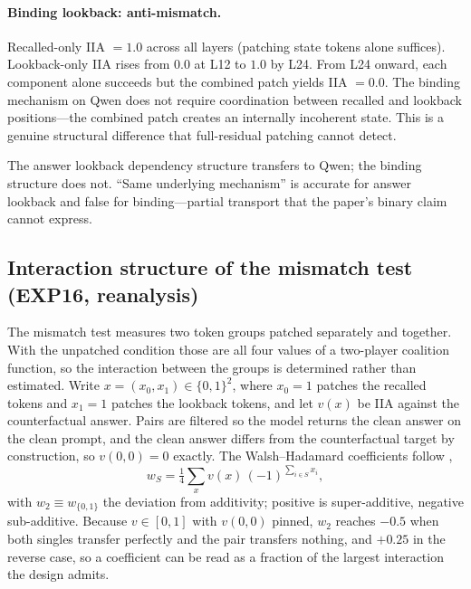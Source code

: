\documentclass{article}
\begin{document}
\paragraph{Binding lookback: anti-mismatch.}
Recalled-only IIA $= 1.0$ across all layers (patching state tokens alone suffices). Lookback-only IIA rises from $0.0$ at L12 to $1.0$ by L24. From L24 onward, each component alone succeeds but the combined patch yields IIA $= 0.0$. The binding mechanism on Qwen does not require coordination between recalled and lookback positions---the combined patch creates an internally incoherent state. This is a genuine structural difference that full-residual patching cannot detect.

The answer lookback dependency structure transfers to Qwen; the binding structure does not. ``Same underlying mechanism'' is accurate for answer lookback and false for binding---partial transport that the paper's binary claim cannot express.

\subsection{Interaction structure of the mismatch test (EXP16, reanalysis)}
\label{sec:interaction}

The mismatch test measures two token groups patched separately and together. With the
unpatched condition those are all four values of a two-player coalition function, so the
interaction between the groups is determined rather than estimated. Write
$x = (x_0, x_1) \in \{0,1\}^2$, where $x_0 = 1$ patches the recalled tokens and $x_1 = 1$
patches the lookback tokens, and let $v(x)$ be IIA against the counterfactual answer. Pairs
are filtered so the model returns the clean answer on the clean prompt, and the clean answer
differs from the counterfactual target by construction, so $v(0,0) = 0$ exactly. The
Walsh--Hadamard coefficients follow \citet{poelwijk2016context},
\begin{equation}
  w_S = \tfrac{1}{4} \sum_{x} v(x)\, (-1)^{\sum_{i \in S} x_i},
\end{equation}
with $w_2 \equiv w_{\{0,1\}}$ the deviation from additivity; positive is super-additive,
negative sub-additive. Because $v \in [0,1]$ with $v(0,0)$ pinned, $w_2$ reaches $-0.5$ when
both singles transfer perfectly and the pair transfers nothing, and $+0.25$ in the reverse
case, so a coefficient can be read as a fraction of the largest interaction the design admits.
\end{document}
